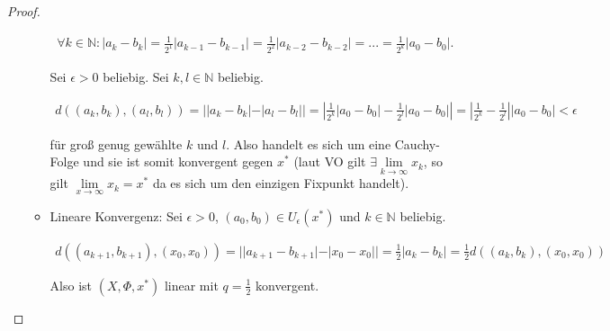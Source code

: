 \documentclass[]{article}
\begin{document}
\begin{proof}
\begin{enumerate}[label=\alph*)]
\begin{itemize}
			\begin{align*}
				\forall k \in \mathbb{N}: |a_k - b_k| = \frac{1}{2^{1}}|a_{k-1} - b_{k-1}| = \frac{1}{2^{2}}|a_{k-2} - b_{k-2}| = ... = \frac{1}{2^{k}}|a_0 - b_0|.
			\end{align*}
			
			Sei $\epsilon > 0$ beliebig. Sei $k, l \in \mathbb{N}$ beliebig.
			
			\begin{align*}
				d((a_k, b_k), (a_l, b_l)) = ||a_k - b_k| - |a_l - b_l|| = \left|\frac{1}{2^{k}}|a_0 - b_0| - \frac{1}{2^{l}}|a_0 - b_0|\right| = \left|\frac{1}{2^{k}}-\frac{1}{2^{l}}\right||a_0 - b_0| < \epsilon
			\end{align*}
			
			für groß genug gewählte $k$ und $l$. Also handelt es sich um eine Cauchy-Folge und sie ist somit konvergent gegen $x^*$ (laut VO gilt $\exists \lim\limits_{k\rightarrow\infty}x_k$, so gilt $\lim\limits_{x\rightarrow\infty}x_k = x^*$ da es sich um den einzigen Fixpunkt handelt).
			
			\item Lineare Konvergenz: Sei $\epsilon >0$, $(a_0, b_0) \in U_\epsilon(x^*)$ und $k \in \mathbb{N}$ beliebig.
			
			\begin{align*}
				d((a_{k+1}, b_{k+1}), (x_0, x_0)) = ||a_{k+1} - b_{k+1}| - |x_0 - x_0|| = \frac{1}{2}|a_{k} - b_{k}| = \frac{1}{2} d((a_k, b_k), (x_0, x_0))
			\end{align*}
			
			Also ist $(X, \Phi, x^*)$ linear mit $q=\frac{1}{2}$ konvergent.
		\end{itemize}
		
	\end{enumerate}
	
\end{proof}

\newpage
\end{document}
